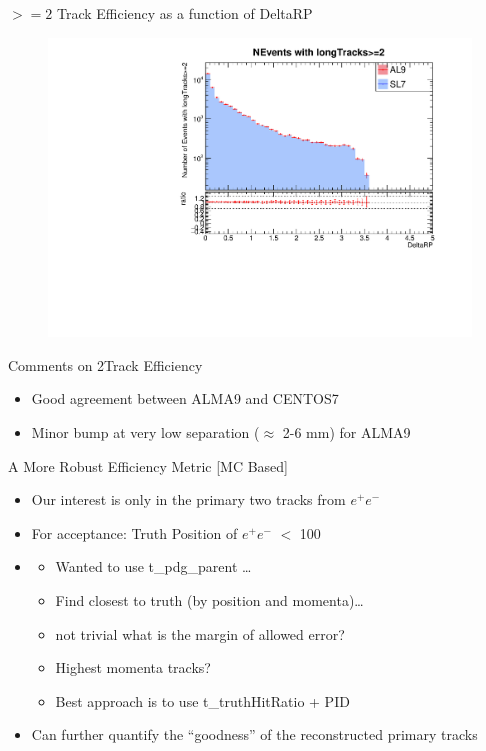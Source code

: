 \begin{frame}{$>=2$ Track Efficiency as a function of DeltaRP}
    \begin{figure}
        \includegraphics[width=\linewidth]{./output/DeltaRP_greq2.pdf}
    \end{figure}
\end{frame}

\begin{frame}{Comments on 2Track Efficiency}
    \begin{itemize}
        \item Good agreement between ALMA9 and CENTOS7
        \item Minor bump at very low separation ($\approx$ 2-6 mm) for ALMA9 
    \end{itemize}
    
\end{frame}
\begin{frame}{A More Robust Efficiency Metric [MC Based]}
    \begin{itemize}
        \item Our interest is only in the primary two tracks from $e^+e^-$
        \item For acceptance: Truth Position of $e^+e^-$ $<$ 100
        \item {}
        \begin{itemize}
            \item Wanted to use t\_pdg\_parent \ldots
            \item Find closest to truth (by position and momenta)\dots 
            \item not trivial what is the margin of allowed error?
            \item Highest momenta tracks?
            \item Best approach is to use t\_truthHitRatio + PID
        \end{itemize}
        \item Can further quantify the ``goodness'' of the reconstructed primary tracks
    \end{itemize}
\end{frame}

